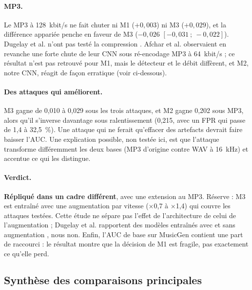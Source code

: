 \documentclass[a4paper, 11pt]{article}
\begin{document}
\paragraph{MP3.} Le MP3 à 128~kbit/s ne fait chuter ni M1 ($+0{,}003$) ni M3 ($+0{,}029$), et la différence
appariée penche en faveur de M3 ($-0{,}026$ $[-0{,}031~;~-0{,}022]$). Dugelay et al. n'ont pas testé la
compression \cite{dugelay2026robustness}. Afchar et al. observaient en revanche une forte chute de leur CNN sous
ré-encodage MP3 à 64~kbit/s \cite{afchar2024easy} ; ce résultat n'est pas retrouvé pour M1, mais le détecteur et
le débit diffèrent, et M2, notre CNN, réagit de façon erratique (voir ci-dessous).

\paragraph{Des attaques qui améliorent.} M3 gagne de 0,010 à 0,029 sous les trois attaques, et M2 gagne 0,202
sous MP3, alors qu'il s'inverse davantage sous ralentissement (0,215, avec un FPR qui passe de 1,4 à 32,5~\%).
Une attaque qui ne ferait qu'effacer des artefacts devrait faire baisser l'AUC. Une explication possible, non
testée ici, est que l'attaque transforme différemment les deux bases (MP3 d'origine contre WAV à 16~kHz) et
accentue ce qui les distingue.

\paragraph{Verdict.} \textbf{Répliqué dans un cadre différent}, avec une extension au MP3. Réserve : M3 est
entraîné avec une augmentation par vitesse ($\times$0,7 à $\times$1,4) qui couvre les attaques testées. Cette
étude ne sépare pas l'effet de l'architecture de celui de l'augmentation ; Dugelay et al. rapportent des
modèles entraînés avec et sans augmentation \cite{dugelay2026robustness}, nous non. Enfin, l'AUC de base
sur MusicGen contient une part de raccourci : le résultat montre que la décision de M1 est fragile, pas
exactement ce qu'elle perd.

\subsection{Synthèse des comparaisons principales}
\end{document}
